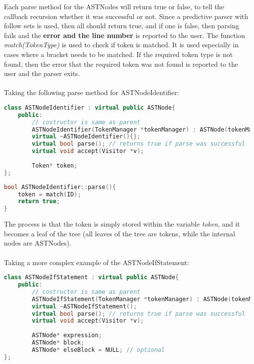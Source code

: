 Each parse method for the ASTNodes will return true or false, to tell the callback recursion whether it was successful or not. Since a predictive parser with follow sets is used, then all should return true, and if one is false, then parsing fails and the \textbf{error and the line number} is reported to the user. The function \textit{match(TokenType)} is used to check if  token is matched. It is used especially in cases where a bracket needs to be matched. If the required token type is not found, then the error that the required token was not found is reported to the user and the parser exits.
\\ \\
Taking the following parse method for ASTNodeIdentifier:
\begin{lstlisting}[language=C++]
class ASTNodeIdentifier : virtual public ASTNode{
	public:
		// costructor is same as parent
		ASTNodeIdentifier(TokenManager *tokenManager) : ASTNode(tokenManager) {};
		virtual ~ASTNodeIdentifier(){};
		virtual bool parse(); // returns true if parse was successful
		virtual void accept(Visitor *v);
		
		Token* token;
};
\end{lstlisting}

\begin{lstlisting}[language=C++]
bool ASTNodeIdentifier::parse(){
	token = match(ID);
	return true;
}
\end{lstlisting}
The process is that the token is simply stored within the variable \textit{token}, and it becomes a leaf of the tree (all leaves of the tree are tokens, while the internal nodes are ASTNodes).
\\\\
Taking a more complex example of the ASTNodeIfStatement:
\begin{lstlisting}[language=C++]
class ASTNodeIfStatement : virtual public ASTNode{
	public:
		// costructor is same as parent
		ASTNodeIfStatement(TokenManager *tokenManager) : ASTNode(tokenManager) {};
		virtual ~ASTNodeIfStatement();
		virtual bool parse(); // returns true if parse was successful
		virtual void accept(Visitor *v);
		
		ASTNode* expression;
		ASTNode* block;
		ASTNode* elseBlock = NULL; // optional
};
\end{lstlisting}

